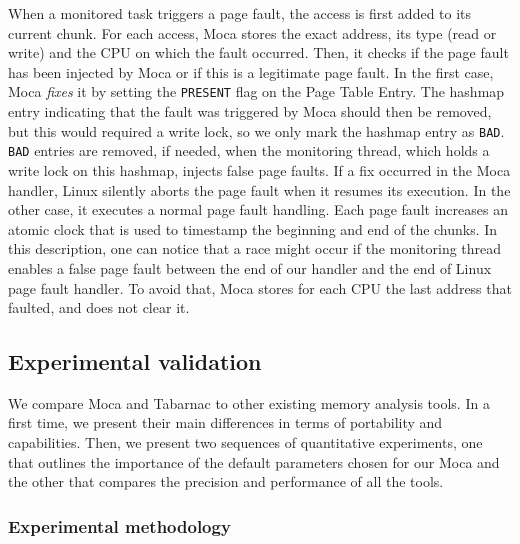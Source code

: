 When a monitored task triggers a page fault, the access is first added to its current chunk.
For each access, \gls{Moca} stores the exact address, its type (read or write) and the CPU on which the fault occurred.
Then, it checks if the page fault has been injected by \gls{Moca} or if this is a legitimate page fault.
In the first case, \gls{Moca} \emph{fixes} it by setting the \texttt{PRESENT} flag on the Page Table Entry.
The hashmap entry indicating that the fault was triggered by \gls{Moca} should then be removed, but this would required a write lock, so we only mark the hashmap entry as \texttt{BAD}.
\texttt{BAD} entries are removed, if needed, when the monitoring thread, which holds a write lock on this hashmap, injects false page faults.
If a fix occurred in the \gls{Moca} handler, Linux silently aborts the page fault when it resumes its execution.
In the other case, it executes a normal page fault handling.
Each page fault increases an atomic clock that is used to timestamp the beginning and end of the chunks.
In this description, one can notice that a race might occur if the monitoring thread enables a false page fault between the end of our handler and the end of Linux page fault handler.
To avoid that, \gls{Moca} stores for each CPU the last address that faulted, and does not clear it.


\subsection{Experimental validation}
\label{sec:Tools-Comp}

We compare \gls{Moca} and \gls{Tabarnac} to other existing memory analysis tools.
In a first time, we present their main differences in terms of portability and capabilities.
Then, we present two sequences of quantitative experiments, one that outlines the importance of the default parameters chosen for our \gls{Moca} and the other that compares the precision and performance of all the tools.

\subsubsection{Experimental methodology}

